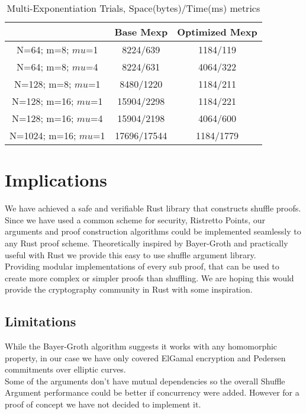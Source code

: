 \documentclass[12pt,a4paper]{report}
\begin{document}
\begin{table}
	\begin{center}
	\begin{tabular}{||c|c|c||}\hline
		\backslashbox{Parameters}{Proof Type} & Base Mexp& Optimized Mexp\\
		\hline
		N=64; m=8; $mu$=1 & 8224/639 & 1184/119\\
		\hline
		N=64; m=8; $mu$=4 & 8224/631 & 4064/322 \\
		\hline
		N=128; m=8; $mu$=1 & 8480/1220 & 1184/211\\
		\hline
		N=128; m=16; $mu$=1 & 15904/2298 & 1184/221\\
		\hline
		N=128; m=16; $mu$=4 & 15904/2198 & 4064/600\\
		\hline
		N=1024; m=16; $mu$=1 & 17696/17544 & 1184/1779\\
		\hline
	\end{tabular}
	\end{center}
	\caption{Multi-Exponentiation Trials, Space(bytes)/Time(ms) metrics}
	\label{table:mexp}
\end{table}

\section{Implications}
We have achieved a safe and verifiable Rust library that constructs shuffle proofs.
Since we have used a common scheme for security, Ristretto Points, our arguments and proof construction algorithms could be implemented seamlessly to any Rust proof scheme.
Theoretically inspired by Bayer-Groth and practically useful with Rust we provide this easy to use shuffle argument library.\\
Providing modular implementations of every sub proof, that can be used to create more complex or simpler proofs than shuffling.
We are hoping this would provide the cryptography community in Rust with some inspiration.
\subsection{Limitations}
While the Bayer-Groth algorithm suggests it works with any homomorphic property,
in our case we have only covered ElGamal encryption and Pedersen commitments over elliptic curves.\\
Some of the arguments don't have mutual dependencies so the overall Shuffle Argument performance
could be better if concurrency were added. However for a proof of concept we have not decided to implement it.
\end{document}

